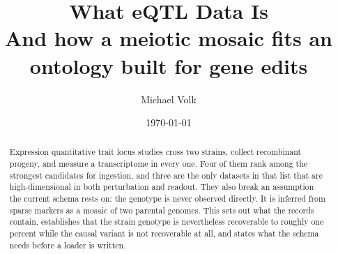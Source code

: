 \documentclass[10pt,a4paper]{article}
\title{\vspace{-1.5em}What eQTL Data Is\\
  {\large And how a meiotic mosaic fits an ontology built for gene edits}}
\author{Michael Volk}
\date{\today}
\begin{document}
\maketitle
\thispagestyle{empty}

\begin{abstract}
\noindent
Expression quantitative trait locus studies cross two strains, collect recombinant
progeny, and measure a transcriptome in every one. Four of them rank among the strongest
candidates for ingestion, and three are the only datasets in that list that are
high-dimensional in both perturbation and readout. They also break an assumption the
current schema rests on: the genotype is never observed directly. It is inferred from
sparse markers as a mosaic of two parental genomes. This sets out what the records
contain, establishes that the strain genotype is nevertheless recoverable to roughly one
percent while the causal variant is not recoverable at all, and states what the schema
needs before a loader is written.
\end{abstract}

\vspace{0.5em}
\tccontents
\clearpage






\end{document}
